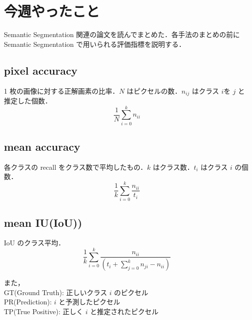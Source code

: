 \documentclass[onecolumn]{ujarticle}     %
\begin{document}
	
	\section{今週やったこと}
	Semantic Segmentation 関連の論文を読んでまとめた．各手法のまとめの前に Semantic Segmentation で用いられる評価指標を説明する．
	\subsection{pixel accuracy}
	1 枚の画像に対する正解画素の比率．$N$ はピクセルの数．$n_{ij}$ はクラス $i$を $j$ と推定した個数．
	\begin{equation}
	\frac{1}{N}\sum_{i=0}^{k}n_{ii}
	\end{equation}
	
	\subsection{mean accuracy}
	各クラスの recall をクラス数で平均したもの．$k$ はクラス数．$t_{i}$ はクラス $i$ の個数．
	\begin{equation}
	\frac{1}{k}\sum_{i=0}^{k}\frac{n_{ii}}{t_{i}}
	\end{equation}
	
	\subsection{mean IU(IoU))}
	IoU のクラス平均．
	\begin{equation}
	\frac{1}{k}\sum_{i=0}^{k}\frac{n_{ii}}{(t_{i}+\sum_{j=0}^{k}n_{ji}-n_{ii})}
	\end{equation}
	
	また，\\
	GT(Ground Truth): 正しいクラス $i$ のピクセル\\
	PR(Prediction): $i$ と予測したピクセル\\
	TP(True Positive): 正しく $i$ と推定されたピクセル
	
\end{document}
